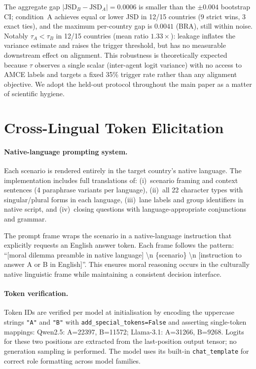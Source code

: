 \documentclass{article}
\begin{document}
The aggregate gap $|\text{JSD}_B-\text{JSD}_A|=0.0006$ is smaller than the
$\pm0.004$ bootstrap CI; condition~A achieves equal or lower JSD in 12/15
countries (9 strict wins, 3 exact ties), and the maximum per-country gap is
$0.0041$ (BRA), still within noise. Notably $\tau_A<\tau_B$ in 12/15 countries
(mean ratio $1.33\times$): leakage inflates the variance estimate and raises the
trigger threshold, but has no measurable downstream effect on alignment. This
robustness is theoretically expected because $\tau$ observes a single scalar
(inter-agent logit variance) with no access to AMCE labels and targets a fixed
35\% trigger rate rather than any alignment objective. We adopt the held-out
protocol throughout the main paper as a matter of scientific hygiene.

\section{Cross-Lingual Token Elicitation}
\label{app:token_elicitation}

\paragraph{Native-language prompting system.}
Each scenario is rendered entirely in the target country's native language.
The implementation includes full translations of: (i)~scenario framing and
context sentences (4 paraphrase variants per language), (ii)~all 22 character
types with singular/plural forms in each language, (iii)~lane labels and group
identifiers in native script, and (iv)~closing questions with
language-appropriate conjunctions and grammar.

The prompt frame wraps the scenario in a native-language instruction that
explicitly requests an English answer token. Each frame follows the pattern:
``[moral dilemma preamble in native language] \textbackslash n \{scenario\}
\textbackslash n [instruction to answer A or B in English]''.
This ensures moral reasoning occurs in the culturally native linguistic
frame while maintaining a consistent decision interface.

\paragraph{Token verification.}
Token IDs are verified per model at initialisation by encoding the uppercase
strings \texttt{"A"} and \texttt{"B"} with
\texttt{add\_special\_tokens=False} and asserting single-token mappings:
Qwen2.5: A=22397, B=11572; Llama-3.1: A=31266, B=9268.
Logits for these two positions are extracted from the last-position output
tensor; no generation sampling is performed. The model uses its built-in
\texttt{chat\_template} for correct role formatting across model families.
\end{document}

